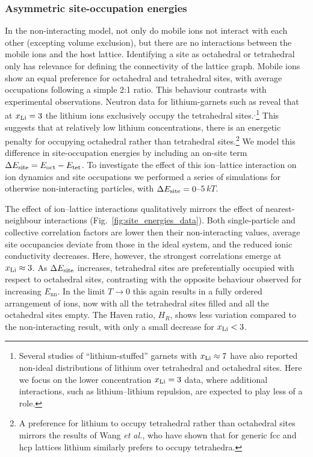 \documentclass[aps,prb,twocolumn,superscriptaddress,reprint]{revtex4-1}
\newcommand{\xLi}{x_\m{Li}}
\begin{document}
\subsubsection{Asymmetric site-occupation energies}
In the non-interacting model, not only do mobile ions not interact with each other (excepting volume exclusion), but there are no interactions between the mobile ions and the host lattice. Identifying a site as octahedral or tetrahedral only has relevance for defining the connectivity of the lattice graph. Mobile ions show an equal preference for octahedral and tetrahedral sites, with average occupations following a simple 2:1 ratio. This behaviour contrasts with experimental observations. Neutron data for lithium-garnets such as  reveal that at $\xLi=3$ the lithium ions exclusively occupy the tetrahedral sites.\cite{OCallaghanEtAl_ChemMater2006}$^,$\footnote{Several studies of ``lithium-stuffed'' garnets with $\xLi\approx7$ have also reported non-ideal distributions of lithium over tetrahedral and octahedral sites.\cite{XieEtAl_ChemMater2011} Here we focus on the lower concentration $\xLi=3$ data, where additional interactions, such as lithium--lithium repulsion, are expected to play less of a role.} 
This suggests that at relatively low lithium concentrations, there is an energetic penalty for occupying octahedral rather than tetrahedral sites.\footnote{A preference for lithium to occupy tetrahedral rather than octahedral sites mirrors the results of Wang \emph{et al.}, who have shown that for generic fcc and hcp lattices lithium similarly prefers to occupy tetrahedra.\cite{WangEtAl_NatMater2015}}
We model this difference in site-occupation energies by including an on-site term $\Delta E_{\mathrm{site}} = E_{\mathrm{oct}} - E_{\mathrm{tet}}$. To investigate the effect of this ion--lattice interaction on ion dynamics and site occupations we performed a series of simulations for otherwise non-interacting particles, with $\Delta E_{\mathrm{site}}=0$--$5\,kT$.

The effect of ion--lattice interactions qualitatively mirrors the effect of nearest-neighbour interactions (Fig.~\ref{fig:site_energies_data}). Both single-particle and collective correlation factors are lower then their non-interacting values, average site occupancies deviate from those in the ideal system, and the reduced ionic conductivity decreases. Here, however, the strongest correlations emerge at $\xLi\approx3$. As $\Delta E_{\mathrm{site}}$ increases, tetrahedral sites are preferentially occupied with respect to octahedral sites, contrasting with the opposite behaviour observed for increasing $E_\mathrm{nn}$. In the limit $T\to0$ this again results in a fully ordered arrangement of ions, now with all the tetrahedral sites filled and all the octahedral sites empty. The Haven ratio, $H_R$, shows less variation compared to the non-interacting result, with only a small decrease for $\xLi<3$.
\end{document}
